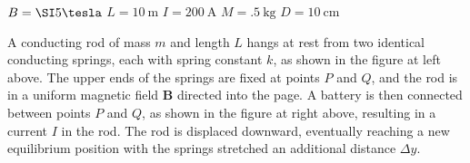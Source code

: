 \documentclass{../../oss-apphys-exam}
\begin{document}
\begin{questions}
\begin{parts}
    $B=\SI5\tesla$\hspace{.3in}
    $L=\SI{10}\metre$\hspace{.3in}
    $I=\SI{200}\ampere$\hspace{.3in}
    $M=\SI{.5}{\kilo\gram}$\hspace{.3in}
    $D=\SI{10}{\centi\metre}$
    \vspace{\stretch1}
  \end{parts}
  \newpage
  
  \question A conducting rod of mass $m$ and length $L$ hangs at rest from two
  identical conducting springs, each with spring constant $k$, as shown in the
  figure at left above. The upper ends of the springs are fixed at points $P$
  and $Q$, and the rod is in a uniform magnetic field $\mathbf B$ directed into
  the page. A battery is then connected between points $P$ and $Q$, as shown in
  the figure at right above, resulting in a current $I$ in the rod. The rod is
  displaced downward, eventually reaching a new equilibrium position with the
  springs stretched an additional distance $\Delta y$.

\end{questions}
\end{document}
